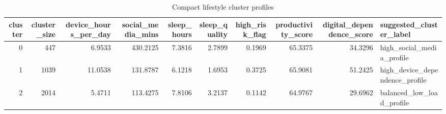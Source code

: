 \begin{table}
\caption{Compact lifestyle cluster profiles}
\label{tab:clustering-profiles-compact}
\begin{tabular}{rrrrrrrrrl}
\toprule
cluster & cluster\_size & device\_hours\_per\_day & social\_media\_mins & sleep\_hours & sleep\_quality & high\_risk\_flag & productivity\_score & digital\_dependence\_score & suggested\_cluster\_label \\
\midrule
0 & 447 & 6.9533 & 430.2125 & 7.3816 & 2.7899 & 0.1969 & 65.3375 & 34.3296 & high\_social\_media\_profile \\
1 & 1039 & 11.0538 & 131.8787 & 6.1218 & 1.6953 & 0.3725 & 65.9081 & 51.2425 & high\_device\_dependence\_profile \\
2 & 2014 & 5.4711 & 113.4275 & 7.8106 & 3.2137 & 0.1142 & 64.9767 & 29.6962 & balanced\_low\_load\_profile \\
\bottomrule
\end{tabular}
\end{table}
